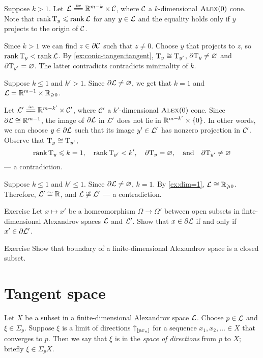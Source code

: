 Suppose $k>1$.
Let $\spc{L}\iso \RR^{m-k}\times \spc{C}$, where $\mathcal{C}$ a $k$-dimensional $\textsc{Alex}(0)$ cone.
Note that $\operatorname{\rm rank}\nolimits\mathrm{T}_y\leqslant\operatorname{\rm rank}\nolimits\mathcal{L}$ for any $y\in\mathcal{L}$ and the equality holds only if $y$ projects to the origin of $\mathcal{C}$.

Since $k>1$ we can find $z\in\partial\mathcal{C}$ such that $z\ne 0$.
Choose $y$ that projects to $z$, so $\operatorname{\rm rank}\nolimits\mathrm{T}_y<\operatorname{\rm rank}\nolimits\mathcal{L}$.
By \ref{ex:conic-tangen:tangent}, $\mathrm{T}_y\cong\mathrm{T}_{y'}$,
$\partial  \mathrm{T}_y\ne\varnothing$ and $\partial \mathrm{T}_{y'}=\varnothing$.
The latter contradicts contradicts minimality of $k$.

 Suppose $k\le1$ and $k'>1$.
Since $\partial \mathcal{L}\ne \varnothing$, we get that $k=1$ and $\mathcal{L}=\mathbb{R}^{m-1}\times\mathbb{R}_{\geqslant0}$.

Let $\spc{L}'\iso \RR^{m-k'}\times \spc{C}'$, where $\mathcal{C}'$ a $k'$-dimensional $\textsc{Alex}(0)$ cone.
Since $\partial\mathcal{L}\cong\mathbb{R}^{m-1}$,
the image of $\partial\mathcal{L}$ in $\mathcal{L}'$ does not lie in $\RR^{m-k'}\z\times\{0\}$.
In other words, we can choose $y\in \partial \mathcal{L}$ such that its image $y'\in \mathcal{L}'$ has nonzero projection in $\mathcal{C}'$.
Observe that $\mathrm{T}_y\cong\mathrm{T}_{y'}$,
\[
\operatorname{\rm rank}\nolimits\mathrm{T}_y\leqslant k=1,
\quad
\operatorname{\rm rank}\nolimits\mathrm{T}_{y'}< k',
\quad
\partial \mathrm{T}_y=\varnothing,
\quad\text{and}\quad
\partial \mathrm{T}_{y'}\ne \varnothing\]
--- a contradiction.

Suppose $k\le 1$ and $k'\le 1$.
Since $\partial \mathcal{L}\ne \varnothing$, $k=1$.
By \ref{ex:dim=1}, $\mathcal{L}\cong \mathbb{R}_{\geqslant0}$.
Therefore, $\mathcal{L}'\cong\mathbb{R}$, and $\mathcal{L}\not\cong\mathcal{L}'$ --- a contradiction.
\qeds

\begin{thm}{Exercise}\label{ex:bry2bry}
Let $x\mapsto x'$ be a homeomorphism $\Omega\to\Omega'$
between open subsets in finte-dimensional Alexandrov spaces $\mathcal{L}$ and $\mathcal{L}'$.
Show that $x\in \partial \mathcal{L}$ if and only if $x'\in \partial \mathcal{L}'$.

\end{thm}

\begin{thm}{Exercise}\label{ex:bry-closed}
Show that boundary of a finite-dimensional Alexandrov space is a closed subset.
\end{thm}

\section{Tangent space}

Let $X$ be a subset in a finite-dimensional Alexandrov space $\mathcal{L}$.
Choose $p\in \mathcal{L}$ and $\xi\in \Sigma_p$.
Suppose $\xi$ is a limit of directions ${\uparrow}_{[{p}{x_n}]}$ for a sequence $x_1,x_2,\dots{}\in X$ that converges to $p$.
Then we say that $\xi$ is in the \emph{space of directions} from $p$ to $X$;
briefly $\xi\in\Sigma_pX$.

